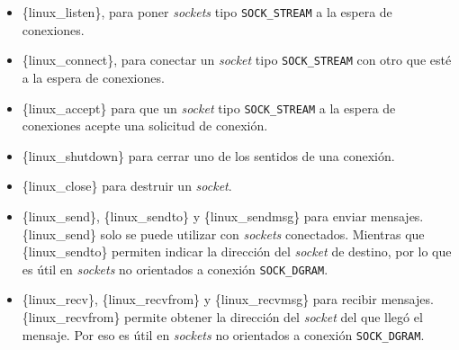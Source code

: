 \begin{itemize}
\item
  \{linux\_listen\}, para poner \emph{sockets} tipo
  \texttt{SOCK\_STREAM} a la espera de conexiones.
\item
  \{linux\_connect\}, para conectar un \emph{socket} tipo
  \texttt{SOCK\_STREAM} con otro que esté a la espera de conexiones.
\item
  \{linux\_accept\} para que un \emph{socket} tipo \texttt{SOCK\_STREAM}
  a la espera de conexiones acepte una solicitud de conexión.
\item
  \{linux\_shutdown\} para cerrar uno de los sentidos de una conexión.
\item
  \{linux\_close\} para destruir un \emph{socket}.
\item
  \{linux\_send\}, \{linux\_sendto\} y \{linux\_sendmsg\} para enviar
  mensajes. \{linux\_send\} solo se puede utilizar con \emph{sockets}
  conectados. Mientras que \{linux\_sendto\} permiten indicar la
  dirección del \emph{socket} de destino, por lo que es útil en
  \emph{sockets} no orientados a conexión \texttt{SOCK\_DGRAM}.
\item
  \{linux\_recv\}, \{linux\_recvfrom\} y \{linux\_recvmsg\} para recibir
  mensajes. \{linux\_recvfrom\} permite obtener la dirección del
  \emph{socket} del que llegó el mensaje. Por eso es útil en
  \emph{sockets} no orientados a conexión \texttt{SOCK\_DGRAM}.
\end{itemize}

\begin{Shaded}
\begin{Highlighting}[]
\OperatorTok{;}
\OperatorTok{;}

\OperatorTok{=}\OperatorTok{(} 
\OperatorTok{,}          
    \OperatorTok{\&}\OperatorTok{,}        
    \OperatorTok{(}\OperatorTok{),} 
    \OperatorTok{,}               
    \OperatorTok{(}\OperatorTok{*)} \OperatorTok{\&}\OperatorTok{,} 
    \OperatorTok{\&}
\OperatorTok{)}
\end{Highlighting}
\end{Shaded}

